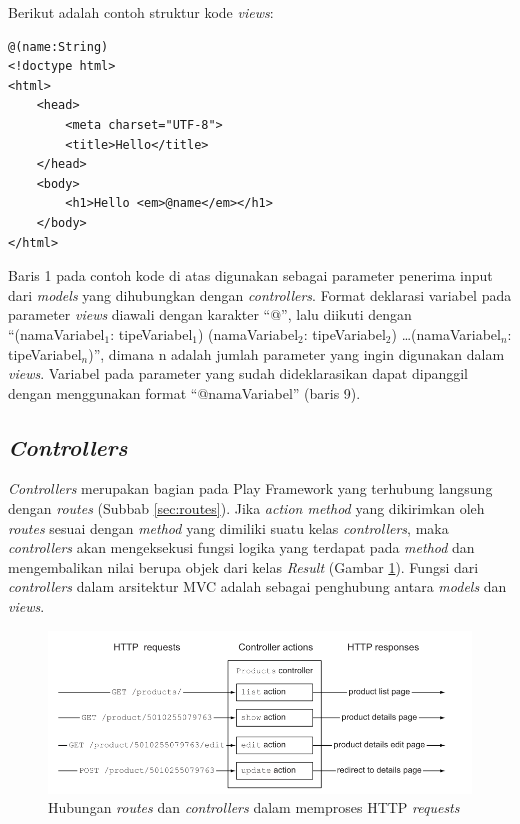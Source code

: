 Berikut adalah contoh struktur kode \textit{views}:

\begin{lstlisting}
@(name:String)
<!doctype html>
<html>
	<head>
		<meta charset="UTF-8">
		<title>Hello</title>
	</head>
	<body>
		<h1>Hello <em>@name</em></h1>
	</body>
</html>
\end{lstlisting}

Baris 1 pada contoh kode di atas digunakan sebagai parameter penerima input dari \textit{models} yang dihubungkan dengan \textit{controllers}. Format deklarasi variabel pada parameter \textit{views} diawali dengan karakter ``@'', lalu diikuti dengan ``(namaVariabel$_1$: tipeVariabel$_1$) (namaVariabel$_2$: tipeVariabel$_2$) \ldots (namaVariabel$_n$: tipeVariabel$_n$)'', dimana n adalah jumlah parameter yang ingin digunakan dalam \textit{views}. Variabel pada parameter yang sudah dideklarasikan dapat dipanggil dengan menggunakan format ``@namaVariabel'' (baris 9).

\subsection{\textit{Controllers}}
\label{sec:controllers}
\textit{Controllers} merupakan bagian pada Play Framework yang terhubung langsung dengan \textit{routes} (Subbab \ref{sec:routes}). Jika \textit{action method} yang dikirimkan oleh \textit{routes} sesuai dengan \textit{method} yang dimiliki suatu kelas \textit{controllers}, maka \textit{controllers} akan mengeksekusi fungsi logika yang terdapat pada \textit{method} dan mengembalikan nilai berupa objek dari kelas \textit{Result} (Gambar \ref{fig:2_controllers1}). Fungsi dari \textit{controllers} dalam arsitektur MVC adalah sebagai penghubung antara \textit{models} dan \textit{views}. 

\begin{figure}[htbp]
	\centering	
		\includegraphics[scale=0.7]{Gambar/2_controllers1.PNG}
	\caption{Hubungan \textit{routes} dan \textit{controllers} dalam memproses HTTP \textit{requests}\cite{playforjava}}
	\label{fig:2_controllers1}
\end{figure}

